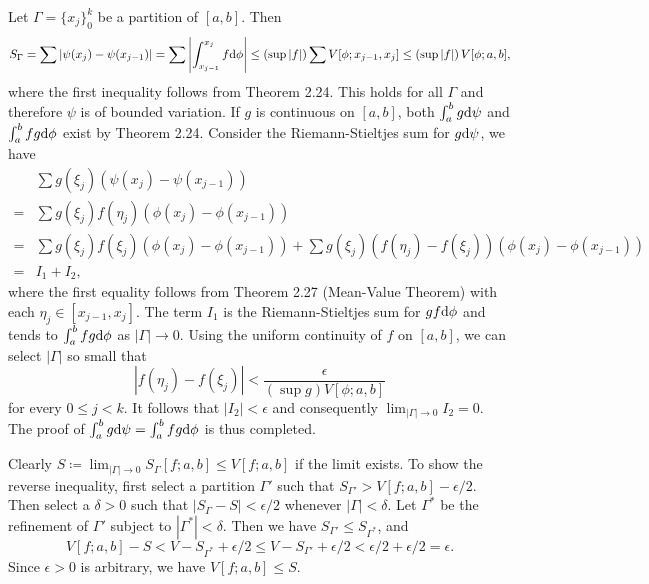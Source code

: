 \begin{exercise}{2.15}
  Let $\Gamma = \{x_j\}_0^k$ be a partition of $[a,b]$. Then
  \[
    S_\Gamma = \sum \left\vert \psi(x_j) - \psi(x_{j-1}) \right\vert
    = \sum \left\vert \int_{x_{j-1}}^{x_j} f \mathrm{d} \phi \right\vert
    \le \left(\sup |f|\right) \sum V[\phi; x_{j-1}, x_j]
    \le \left(\sup |f|\right) V[\phi; a,b],
  \]
  where the first inequality follows from Theorem 2.24.
  This holds for all $\Gamma$ and therefore $\psi$ is of bounded variation.
  If $g$ is continuous on $[a,b]$,
  both $\int_a^b g \mathrm{d} \psi$ and $\int_a^b fg \mathrm{d} \phi$ exist
  by Theorem 2.24.
  Consider the Riemann-Stieltjes sum for $g \mathrm{d} \psi$, we have
  \begin{align*}
    & \sum g(\xi_j) \left( \psi(x_j) - \psi(x_{j-1}) \right) \\
    = & \sum g(\xi_j) f(\eta_j) \left( \phi(x_j) - \phi(x_{j-1}) \right) \\
    = & \sum g(\xi_j) f(\xi_j) \left( \phi(x_j) - \phi(x_{j-1}) \right)
    + \sum g(\xi_j) \left( f(\eta_j) - f(\xi_j) \right)
    \left( \phi(x_j) - \phi(x_{j-1}) \right) \\
    = & I_1 + I_2,
  \end{align*}
  where the first equality follows from Theorem 2.27 (Mean-Value Theorem)
  with each $\eta_j \in [x_{j-1}, x_j]$.
  The term $I_1$ is the Riemann-Stieltjes sum for $gf \mathrm{d} \phi$
  and tends to $\int_a^b fg \mathrm{d} \phi$ as $|\Gamma| \rightarrow 0$.
  Using the uniform continuity of $f$ on $[a,b]$,
  we can select $|\Gamma|$ so small that
  \[
    \left\vert f(\eta_j) - f(\xi_j) \right\vert <
    \frac{\epsilon} {\left( \sup g \right) V[\phi; a,b]}
  \]
  for every $0 \le j < k$.
  It follows that $|I_2| < \epsilon$
  and consequently $\lim_{|\Gamma| \rightarrow 0} I_2 = 0$.
  The proof of $\int_a^b g \mathrm{d} \psi = \int_a^b fg \mathrm{d} \phi$ is thus completed.
\end{exercise}

\begin{exercise}{2.20}
  Clearly $S \coloneqq \lim_{|\Gamma| \rightarrow 0} S_\Gamma[f;a,b] \le V[f;a,b]$
  if the limit exists.
  To show the reverse inequality,
  first select a partition $\Gamma'$ such that
  $S_{\Gamma'} > V[f;a,b] - \epsilon/2$.
  Then select a $\delta > 0$ such that
  $|S_\Gamma - S| < \epsilon/2$ whenever $|\Gamma| < \delta$.
  Let $\Gamma^\ast$ be the refinement of $\Gamma'$
  subject to $|\Gamma^\ast| < \delta$.
  Then we have $S_{\Gamma'} \le S_{\Gamma^\ast}$, and
  \[
    V[f;a,b] - S < V - S_{\Gamma^\ast} + \epsilon/2
    \le V - S_{\Gamma'} + \epsilon/2
    < \epsilon/2 + \epsilon/2 = \epsilon.
  \]
  Since $\epsilon > 0$ is arbitrary,
  we have $V[f;a,b] \le S$.
\end{exercise}

